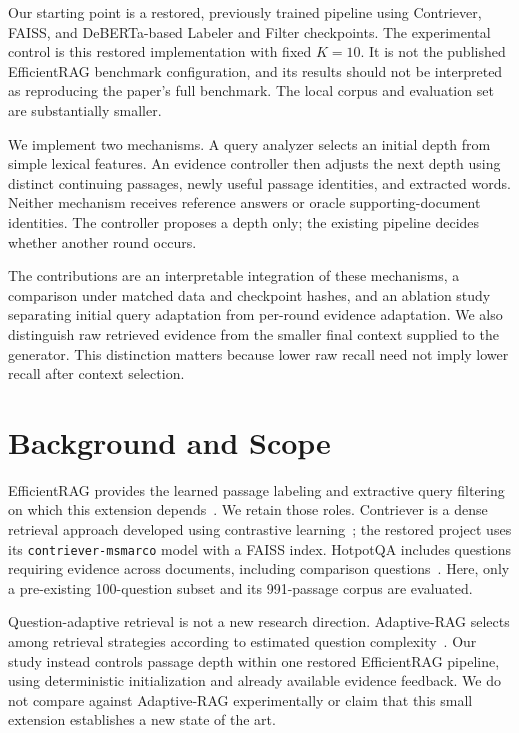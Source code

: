 \documentclass[conference]{IEEEtran}
\begin{document}
Our starting point is a restored, previously trained pipeline using Contriever, FAISS, and DeBERTa-based Labeler and Filter checkpoints. The experimental control is this restored implementation with fixed $K=10$. It is not the published EfficientRAG benchmark configuration, and its results should not be interpreted as reproducing the paper's full benchmark. The local corpus and evaluation set are substantially smaller.

We implement two mechanisms. A query analyzer selects an initial depth from simple lexical features. An evidence controller then adjusts the next depth using distinct continuing passages, newly useful passage identities, and extracted words. Neither mechanism receives reference answers or oracle supporting-document identities. The controller proposes a depth only; the existing pipeline decides whether another round occurs.

The contributions are an interpretable integration of these mechanisms, a comparison under matched data and checkpoint hashes, and an ablation study separating initial query adaptation from per-round evidence adaptation. We also distinguish raw retrieved evidence from the smaller final context supplied to the generator. This distinction matters because lower raw recall need not imply lower recall after context selection.

\section{Background and Scope}
EfficientRAG provides the learned passage labeling and extractive query filtering on which this extension depends~\cite{efficientrag}. We retain those roles. Contriever is a dense retrieval approach developed using contrastive learning~\cite{contriever}; the restored project uses its \texttt{contriever-msmarco} model with a FAISS index. HotpotQA includes questions requiring evidence across documents, including comparison questions~\cite{hotpotqa}. Here, only a pre-existing 100-question subset and its 991-passage corpus are evaluated.

Question-adaptive retrieval is not a new research direction. Adaptive-RAG selects among retrieval strategies according to estimated question complexity~\cite{adaptive}. Our study instead controls passage depth within one restored EfficientRAG pipeline, using deterministic initialization and already available evidence feedback. We do not compare against Adaptive-RAG experimentally or claim that this small extension establishes a new state of the art.
\end{document}
